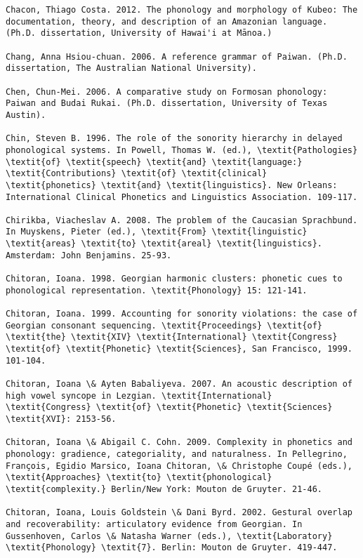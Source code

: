 \begin{verbatim}
Chacon, Thiago Costa. 2012. The phonology and morphology of Kubeo: The documentation, theory, and description of an Amazonian language. (Ph.D. dissertation, University of Hawai'i at Mānoa.)

Chang, Anna Hsiou-chuan. 2006. A reference grammar of Paiwan. (Ph.D. dissertation, The Australian National University).

Chen, Chun-Mei. 2006. A comparative study on Formosan phonology: Paiwan and Budai Rukai. (Ph.D. dissertation, University of Texas Austin).

Chin, Steven B. 1996. The role of the sonority hierarchy in delayed phonological systems. In Powell, Thomas W. (ed.), \textit{Pathologies} \textit{of} \textit{speech} \textit{and} \textit{language:} \textit{Contributions} \textit{of} \textit{clinical} \textit{phonetics} \textit{and} \textit{linguistics}. New Orleans: International Clinical Phonetics and Linguistics Association. 109-117.

Chirikba, Viacheslav A. 2008. The problem of the Caucasian Sprachbund. In Muyskens, Pieter (ed.), \textit{From} \textit{linguistic} \textit{areas} \textit{to} \textit{areal} \textit{linguistics}. Amsterdam: John Benjamins. 25-93.

Chitoran, Ioana. 1998. Georgian harmonic clusters: phonetic cues to phonological representation. \textit{Phonology} 15: 121-141.

Chitoran, Ioana. 1999. Accounting for sonority violations: the case of Georgian consonant sequencing. \textit{Proceedings} \textit{of} \textit{the} \textit{XIV} \textit{International} \textit{Congress} \textit{of} \textit{Phonetic} \textit{Sciences}, San Francisco, 1999. 101-104.

Chitoran, Ioana \& Ayten Babaliyeva. 2007. An acoustic description of high vowel syncope in Lezgian. \textit{International} \textit{Congress} \textit{of} \textit{Phonetic} \textit{Sciences} \textit{XVI}: 2153-56.

Chitoran, Ioana \& Abigail C. Cohn. 2009. Complexity in phonetics and phonology: gradience, categoriality, and naturalness. In Pellegrino, François, Egidio Marsico, Ioana Chitoran, \& Christophe Coupé (eds.), \textit{Approaches} \textit{to} \textit{phonological} \textit{complexity.} Berlin/New York: Mouton de Gruyter. 21-46.

Chitoran, Ioana, Louis Goldstein \& Dani Byrd. 2002. Gestural overlap and recoverability: articulatory evidence from Georgian. In Gussenhoven, Carlos \& Natasha Warner (eds.), \textit{Laboratory} \textit{Phonology} \textit{7}. Berlin: Mouton de Gruyter. 419-447.


\end{verbatim}
